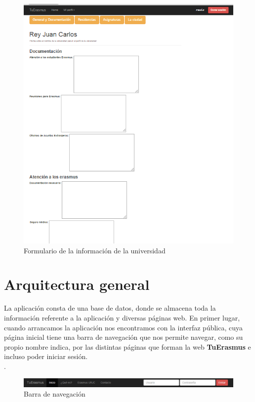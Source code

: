 \begin{figure}[htbp]
	
	\centering
	\includegraphics[scale=0.4]{./Figuras/tuerasmusPages/privatePages/formInfo.png}
	\caption{Formulario de la informaci\'on de la universidad}
	\label{fig:formInfo}
	
\end{figure}

\section{Arquitectura general}
La aplicaci\'on consta de una base de datos, donde se almacena toda la informaci\'on referente a la aplicaci\'on y diversas p\'aginas web. En primer lugar, cuando arrancamos la aplicaci\'on nos encontramos con la interfaz p\'ublica, cuya p\'agina inicial tiene una barra de navegaci\'on que nos permite navegar, como su propio nombre indica, por las distintas p\'aginas que forman la web \textbf{TuErasmus} e incluso poder iniciar sesi\'on.\\ 

\textit{}.\\
\begin{figure}[htbp]
	
	\centering
	\includegraphics[scale=0.4]{./Figuras/tuerasmusPages/navbar.png}
	\caption{Barra de navegaci\'on}
	\label{fig:navbar}
	
\end{figure}

